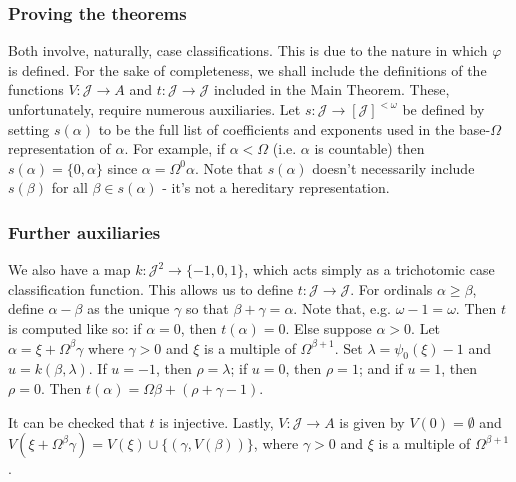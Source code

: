 \documentclass{beamer}
\begin{document}
\begin{frame}
\frametitle{Proving the theorems}
Both involve, naturally, case classifications. This is due to the nature in which $\varphi$ is defined. For the sake of completeness, we shall include the definitions of the functions $V: \mathcal{J} \to A$ and $t: \mathcal{J} \to \mathcal{J}$ included in the Main Theorem. These, unfortunately, require numerous auxiliaries. \pause Let $s: \mathcal{J} \to [\mathcal{J}]^{< \omega}$ be defined by setting $s(\alpha)$ to be the full list of coefficients and exponents used in the base-$\Omega$ representation of $\alpha$. For example, if $\alpha < \Omega$ (i.e. $\alpha$ is countable) then $s(\alpha) = \{0,\alpha\}$ since $\alpha = \Omega^0 \alpha$. \pause Note that $s(\alpha)$ doesn't necessarily include $s(\beta)$ for all $\beta \in s(\alpha)$ - it's not a \alert{hereditary} representation.
\end{frame}

\begin{frame}
\frametitle{Further auxiliaries}
We also have a map $k: \mathcal{J}^2 \to \{-1,0,1\}$, which acts simply as a trichotomic case classification function. This allows us to define $t: \mathcal{J} \to \mathcal{J}$. \pause For ordinals $\alpha \geq \beta$, define $\alpha - \beta$ as the unique $\gamma$ so that $\beta + \gamma = \alpha$. Note that, e.g. $\omega - 1 = \omega$. \pause Then $t$ is computed like so: if $\alpha = 0$, then $t(\alpha) = 0$. Else suppose $\alpha > 0$. Let $\alpha = \xi + \Omega^\beta \gamma$ where $\gamma > 0$ and $\xi$ is a multiple of $\Omega^{\beta + 1}$. Set $\lambda = \psi_0(\xi) - 1$ and $u = k(\beta, \lambda)$. If $u = -1$, then $\rho = \lambda$; if $u = 0$, then $\rho = 1$; and if $u = 1$, then $\rho = 0$. Then $t(\alpha) = \Omega \beta + (\rho + \gamma - 1)$.

\pause

It can be checked that $t$ is injective. Lastly, $V: \mathcal{J} \to A$ is given by $V(0) = \emptyset$ and $V(\xi + \Omega^\beta \gamma) = V(\xi) \cup \{(\gamma, V(\beta))\}$, where $\gamma > 0$ and $\xi$ is a multiple of $\Omega^{\beta + 1}$.
\end{frame}
\end{document}
